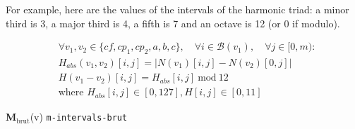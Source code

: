 For example, here are the values of the intervals of the harmonic triad: a minor third is 3, a major third is 4, a fifth is 7 and an octave is 12 (or 0 if modulo).

\begin{equation}
\begin{aligned}
    &\forall v_1, v_2 \in \{\mathit{cf}, cp_1, cp_2, a, b, c\}, \quad \forall i \in \mathcal{B}(v_1), \quad \forall j \in [0, m):\\
    &H_{abs}(v_1,v_2)[i, j] = \left|N(v_1)[i, j] - N(v_2)[0,j]\right|\\
    &H(v_1-v_2)[i, j] = H_{abs}[i, j]\ \text{mod}\ 12\\
    &\text{where } H_{abs}[i, j] \in [0, 127], H[i, j] \in [0, 11]
\end{aligned}
\end{equation}

\vspace{.5cm}
\noindent \textbf{M}$_{\text{brut}}$(v) \hspace*{.2cm} \texttt{m-intervals-brut}

